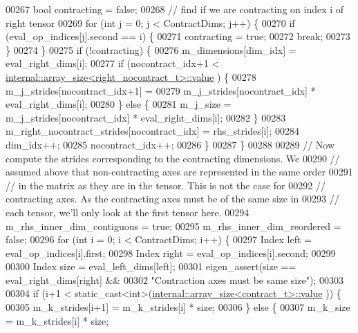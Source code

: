 \begin{DoxyCode}
00267       \textcolor{keywordtype}{bool} contracting = \textcolor{keyword}{false};
00268       \textcolor{comment}{// find if we are contracting on index i of right tensor}
00269       \textcolor{keywordflow}{for} (\textcolor{keywordtype}{int} j = 0; j < ContractDims; j++) \{
00270         \textcolor{keywordflow}{if} (eval\_op\_indices[j].second == i) \{
00271           contracting = \textcolor{keyword}{true};
00272           \textcolor{keywordflow}{break};
00273         \}
00274       \}
00275       \textcolor{keywordflow}{if} (!contracting) \{
00276         m\_dimensions[dim\_idx] = eval\_right\_dims[i];
00277         \textcolor{keywordflow}{if} (nocontract\_idx+1 < \hyperlink{struct_eigen_1_1internal_1_1array__size}{internal::array\_size<right\_nocontract\_t>::value}
      ) \{
00278           m\_j\_strides[nocontract\_idx+1] =
00279               m\_j\_strides[nocontract\_idx] * eval\_right\_dims[i];
00280         \} \textcolor{keywordflow}{else} \{
00281           m\_j\_size = m\_j\_strides[nocontract\_idx] * eval\_right\_dims[i];
00282         \}
00283         m\_right\_nocontract\_strides[nocontract\_idx] = rhs\_strides[i];
00284         dim\_idx++;
00285         nocontract\_idx++;
00286       \}
00287     \}
00288 
00289     \textcolor{comment}{// Now compute the strides corresponding to the contracting dimensions. We}
00290     \textcolor{comment}{// assumed above that non-contracting axes are represented in the same order}
00291     \textcolor{comment}{// in the matrix as they are in the tensor. This is not the case for}
00292     \textcolor{comment}{// contracting axes. As the contracting axes must be of the same size in}
00293     \textcolor{comment}{// each tensor, we'll only look at the first tensor here.}
00294     m\_rhs\_inner\_dim\_contiguous = \textcolor{keyword}{true};
00295     m\_rhs\_inner\_dim\_reordered = \textcolor{keyword}{false};
00296     \textcolor{keywordflow}{for} (\textcolor{keywordtype}{int} i = 0; i < ContractDims; i++) \{
00297       Index left = eval\_op\_indices[i].first;
00298       Index right = eval\_op\_indices[i].second;
00299 
00300       Index size = eval\_left\_dims[left];
00301       eigen\_assert(size == eval\_right\_dims[right] &&
00302                    \textcolor{stringliteral}{"Contraction axes must be same size"});
00303 
00304       \textcolor{keywordflow}{if} (i+1 < static\_cast<int>(\hyperlink{struct_eigen_1_1internal_1_1array__size}{internal::array\_size<contract\_t>::value}
      )) \{
00305         m\_k\_strides[i+1] = m\_k\_strides[i] * size;
00306       \} \textcolor{keywordflow}{else} \{
00307         m\_k\_size = m\_k\_strides[i] * size;

\end{DoxyCode}
